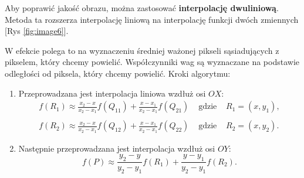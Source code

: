 Aby poprawić jakość obrazu, można zastosować \textbf{interpolację dwuliniową}. Metoda ta rozszerza interpolację liniową na interpolację funkcji dwóch zmiennych [Rys \ref{fig:image6}]. 



W efekcie polega to na wyznaczeniu średniej ważonej pikseli sąsiadujących z pikselem, który chcemy powielić. Współczynniki wag są wyznaczane na podstawie odległości od piksela, który chcemy powielić.
Kroki algorytmu:
\begin{enumerate}
    \item Przeprowadzana jest interpolacja liniowa wzdłuż osi $O X$:
    $$
    \begin{array}{llll}
    f\left(R_1\right) \approx \frac{x_2-x}{x_2-x_1} f\left(Q_{11}\right)+\frac{x-x_1}{x_2-x_1} f\left(Q_{21}\right) & \text { gdzie } & R_1=\left(x, y_1\right), \\ \\
    f\left(R_2\right) \approx \frac{x_2-x}{x_2-x_1} f\left(Q_{12}\right)+\frac{x-x_1}{x_2-x_1} f\left(Q_{22}\right) & \text { gdzie } & R_2=\left(x, y_2\right) .
    \end{array}
    $$
    \item Następnie przeprowadzana jest interpolacja wzdłuż osi $O Y$:
    $$
    f(P) \approx \frac{y_2-y}{y_2-y_1} f\left(R_1\right)+\frac{y-y_1}{y_2-y_1} f\left(R_2\right) .
    $$
\end{enumerate}

